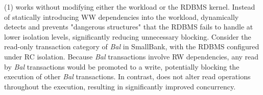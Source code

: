 






(1) \sysname works without modifying either the workload or the RDBMS kernel. Instead of statically introducing WW dependencies into the workload, \sysname dynamically detects and prevents "dangerous structures" that the RDBMS fails to handle at lower isolation levels, significantly reducing unnecessary blocking. Consider the read-only transaction category of \textit{Bal} in SmallBank, with the RDBMS configured under RC isolation.
Because \textit{Bal} transactions involve RW dependencies, any read by \textit{Bal} transactions would be promoted to a write, potentially blocking the execution of other \textit{Bal} transactions. In contrast, \sysname does not alter read operations throughout the execution, resulting in significantly improved concurrency.


 
